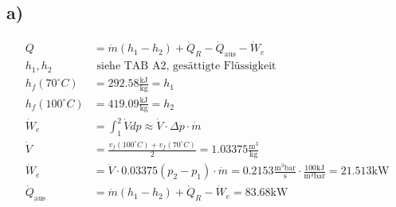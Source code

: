 

\subsection*{a)}
\begin{align*}
Q &= \dot{m} (h_1 - h_2) + \dot{Q}_R - \dot{Q}_{\text{aus}} - \dot{W}_e \\
h_1, h_2 &\text{ siehe TAB A2, gesättigte Flüssigkeit} \\
h_f(70^\circ C) &= 292.58 \frac{\text{kJ}}{\text{kg}} = h_1 \\
h_f(100^\circ C) &= 419.09 \frac{\text{kJ}}{\text{kg}} = h_2 \\
\dot{W}_e &= \int_{1}^{2} \dot{V} dp \approx \dot{V} \cdot \Delta p \cdot \dot{m} \\
\dot{V} &= \frac{v_f(100^\circ C) + v_f(70^\circ C)}{2} = 1.03375 \frac{\text{m}^3}{\text{kg}} \\
\dot{W}_e &= \dot{V} \cdot 0.03375 (p_2 - p_1) \cdot \dot{m} = 0.2153 \frac{\text{m}^3 \text{bar}}{\text{s}} \cdot \frac{100 \text{kJ}}{\text{m}^3 \text{bar}} = 21.513 \text{kW} \\
\dot{Q}_{\text{aus}} &= \dot{m} (h_1 - h_2) + \dot{Q}_R - \dot{W}_e = 83.68 \text{kW}
\end{align*}